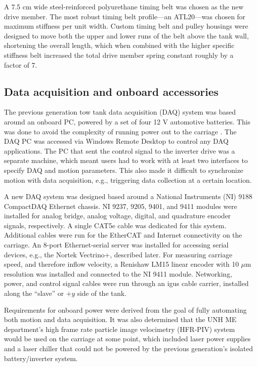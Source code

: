 A 7.5 cm wide steel-reinforced polyurethane timing belt was chosen as the new
drive member. The most robust timing belt profile---an ATL20---was chosen for
maximum stiffness per unit width. Custom timing belt and pulley housings were
designed to move both the upper and lower runs of the belt above the tank wall,
shortening the overall length, which when combined with the higher specific
stiffness belt increased the total drive member spring constant roughly by a
factor of 7.


\subsection{Data acquisition and onboard accessories}

The previous generation tow tank data acquisition (DAQ) system was based around
an onboard PC, powered by a set of four 12 V automotive batteries. This was
done to avoid the complexity of running power out to the carriage
\cite{Darnell1996}. The DAQ PC was accessed via Windows Remote Desktop to
control any DAQ applications. The PC that sent the control signal to the
inverter drive was a separate machine, which meant users had to work with at
least two interfaces to specify DAQ and motion parameters. This also made it
difficult to synchronize motion with data acquisition, e.g., triggering data
collection at a certain location.

A new DAQ system was designed based around a National Instruments (NI) 9188
CompactDAQ Ethernet chassis. NI 9237, 9205, 9401, and 9411 modules were
installed for analog bridge, analog voltage, digital, and quadrature encoder
signals, respectively. A single CAT5e cable was dedicated for this system.
Additional cables were run for the EtherCAT and Internet connectivity on the
carriage. An 8-port Ethernet-serial server was installed for accessing serial
devices, e.g., the Nortek Vectrino+, described later. For measuring carriage
speed, and therefore inflow velocity, a Renishaw LM15 linear encoder with 10
$\mu$m resolution was installed and connected to the NI 9411 module. Networking,
power, and control signal cables were run through an igus cable carrier,
installed along the ``slave'' or $+y$ side of the tank.

Requirements for onboard power were derived from the goal of fully automating
both motion and data acquisition. It was also determined that the UNH ME
department's high frame rate particle image velocimetry (HFR-PIV) system would
be used on the carriage at some point, which included laser power supplies and a
laser chiller that could not be powered by the previous generation's isolated
battery/inverter system. 

